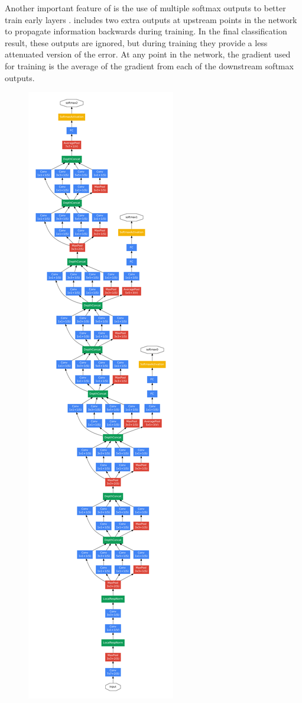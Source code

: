 Another important feature of \googlenet is the use of multiple softmax outputs to better train early layers \cite{szegedy2014going}.
\googlenet includes two extra outputs at upstream points in the network to propagate information backwards during training.
In the final classification result, these outputs are ignored, but during training they provide a less attenuated version of the error.
At any point in the network, the gradient used for training is the average of the gradient from each of the downstream softmax outputs.

\begin{figure}
  \begin{center}
    \includegraphics[height=0.9\textheight]{figures/figures/inceptionoverall.pdf}

\end{center}
\end{figure}

